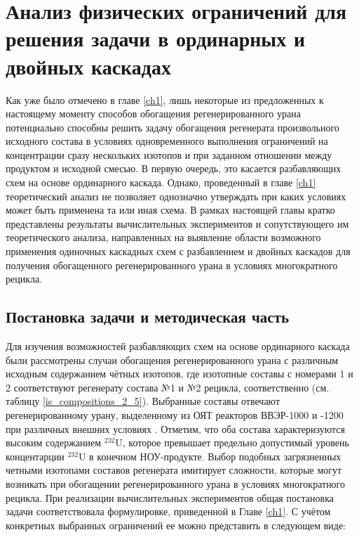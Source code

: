 \chapter{Анализ физических ограничений для решения задачи в ординарных и двойных каскадах}\label{ch:ch2}

Как уже было отмечено в главе \ref{ch1}, лишь некоторые из предложенных к настоящему моменту способов обогащения регенерированного урана потенциально способны решить задачу обогащения регенерата произвольного исходного состава в условиях одновременного выполнения ограничений на концентрации сразу нескольких изотопов и при заданном отношении между продуктом и исходной смесью. В первую очередь, это касается разбавляющих схем на основе ординарного каскада. 
Однако, проведенный в главе \ref{ch1} теоретический анализ не позволяет однозначно утверждать при каких условиях может быть применена та или иная схема. В рамках настоящей главы кратко представлены результаты вычислительных экспериментов и сопутствующего им теоретического анализа, направленных на выявление области возможного применения одиночных каскадных схем с разбавлением и двойных каскадов для получения обогащенного регенерированного урана в условиях многократного рецикла. 

\section{Постановка задачи и методическая часть}\label{ch2_stat}

Для изучения возможностей разбавляющих схем на основе ординарного каскада были рассмотрены случаи обогащения регенерированного урана с различным исходным содержанием чётных изотопов, где изотопные составы с номерами 1 и 2 соответствуют регенерату состава  №1 и №2 рецикла, соответственно (см. таблицу \ref{is_compositions_2_5}). Выбранные составы отвечают регенерированному урану, выделенному из ОЯТ реакторов ВВЭР-1000 и -1200 при различных внешних условиях \cite{palkinDesignanalyticalResearchRefinement2010,nevinicaToplivnyyCiklLegkovodnogo2019}. Отметим, что оба состава характеризуются высоким содержанием $^{232}$U, которое превышает предельно допустимый уровень концентарции $^{232}$U в конечном НОУ-продукте. Выбор подобных загрязненных четными изотопами составов регенерата имитирует сложности, которые могут возникать при обогащении регенерированного урана в условиях многократного рецикла.  
При реализации вычислительных экспериментов общая постановка задачи соответствовала формулировке, приведенной в Главе \ref{ch1}. С учётом конкретных выбранных ограничений ее можно представить в следующем виде:

